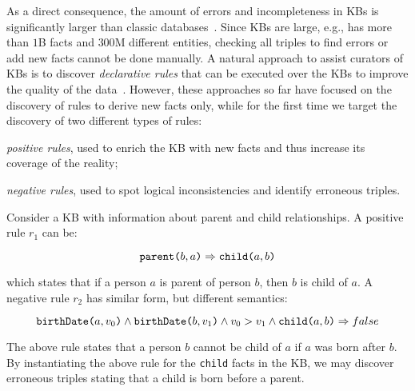 As a direct consequence, the amount of errors and incompleteness in KBs is significantly larger than classic databases~\cite{suchanek2009sofie}.
Since KBs are large, e.g., \wikidata has more than $1$B facts and $300$M different entities, %
checking all triples to find errors or add new facts cannot be done manually. %
A natural approach to assist curators of KBs is to discover %
\emph{declarative rules} that can be executed over the KBs to improve the quality of the data~\cite{Chen:2016,abedjan2014amending,galarraga2015fast}. However, these approaches so far have focused on the discovery of rules to derive new facts only, while for the first time
we target the discovery %
of two different types of rules:
\begin{inparaenum}[\itshape(i)]
	\item {\em positive rules}, used to enrich the KB with new facts and thus increase its coverage of the reality;
	\item {\em negative rules}, used to spot logical inconsistencies and identify erroneous triples.
\end{inparaenum}

\begin{example}\label{ex:krd_intro}
	Consider a KB with information about parent and child relationships.
	A positive rule $r_1$ can be:
	
	\vspace{-1ex}
	{\small
		\begin{equation*}
			\texttt{parent(}b,a\texttt{)} \Rightarrow \texttt{child(}a,b\texttt{)}
		\end{equation*}
	} 
	\vspace{-2ex}
	
	\noindent
	which states that if a person $a$ is parent of person $b$, then $b$ is child of $a$. 
	A negative rule $r_2$ has similar form, but different semantics:
	
	\vspace{-2.5ex}
	{\small
		\begin{equation*}
			\texttt{birthDate(}a,v_0\texttt{)} \wedge \texttt{birthDate(}b,v_1\texttt{)} \wedge v_0 > v_1 \wedge  \texttt{child(}a,b\texttt{)}  \Rightarrow false
		\end{equation*}
	} 
	\vspace{-2ex}
	
	\noindent The above rule states that a person $b$ cannot be child of $a$ if $a$ was born after $b$. By instantiating the above rule for the \texttt{child} facts in the KB, we may discover erroneous triples stating that a child is born before a parent.
\end{example}

